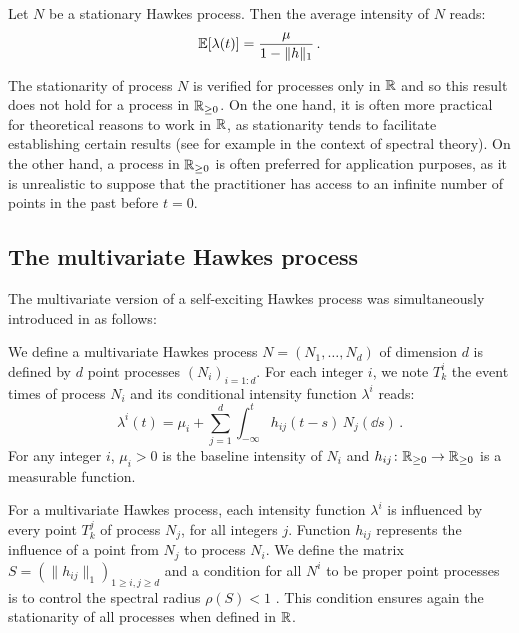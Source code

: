 \begin{proposition}
    Let $N$ be a stationary Hawkes process.
    Then the average intensity of $N$ reads:
    \[{\mathbb E}[\lambda(t)] = \frac{\mu}{1-\|h\|_1}\,.\]
\end{proposition}
The stationarity of process $N$ is verified for processes only in ${\mathbb R}$ and so this result does not hold for a process in ${\mathbb R}_{\geq 0}$.
On the one hand, it is often more practical for theoretical reasons to work in ${\mathbb R}$, as stationarity tends to facilitate establishing certain results (see \textcite{Hawkes1971} for example in the context of spectral theory).
On the other hand, a process in ${\mathbb R}_{\geq 0}$ is often preferred for application purposes, as it is unrealistic to suppose that the practitioner has access to an infinite number of points in the past before $t=0$.


\subsection{The multivariate Hawkes process}

The multivariate version of a self-exciting Hawkes process was simultaneously introduced in \textcite{Hawkes1971} as follows: 

\begin{definition}\label{def:chap1_multivariate_hawkes}
    We define a multivariate Hawkes process $N = (N_1, \ldots, N_d)$ of dimension $d$ is defined by $d$ point processes $(N_i)_{i=1:d}$.
    For each integer $i$, we note $T_k^i$ the event times of process $N_i$ and its conditional intensity function $\lambda^i$ reads:
    \[\lambda^i(t) = \mu_i + \sum_{j=1}^{d}\int_{-\infty}^{t}{h_{ij}(t-s)}\,N_j(\dd s)\,.\]
    For any integer $i$, $\mu_i>0$ is the baseline intensity of $N_i$ and $h_{ij}\colon{\mathbb R}_{\geq 0}\to {\mathbb R}_{\geq 0}$ is a measurable function.
\end{definition}
For a multivariate Hawkes process, each intensity function $\lambda^i$ is influenced by every point $T_k^j$ of process $N_j$, for all integers $j$.
Function $h_{ij}$ represents the influence of a point from $N_j$ to process $N_i$. We define the matrix $S = (\|h_{ij}\|_1)_{1 \geq i,j \geq d}$ and a condition for all $N^i$ to be proper point processes is to control the spectral radius $\rho(S) < 1$ \parencite{Bacry2015}.
This condition ensures again the stationarity of all processes when defined in ${\mathbb R}$.

